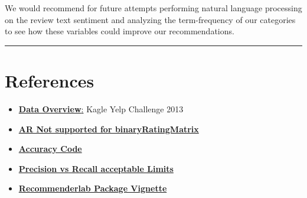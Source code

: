 \documentclass[]{article}
\providecommand{\tightlist}{%
  \setlength{\itemsep}{0pt}\setlength{\parskip}{0pt}}
\begin{document}
We would recommend for future attempts performing natural language
processing on the review text sentiment and analyzing the term-frequency
of our categories to see how these variables could improve our
recommendations.

\begin{center}\rule{0.5\linewidth}{\linethickness}\end{center}

\hypertarget{references}{%
\section{References}\label{references}}

\begin{itemize}
\tightlist
\item
  \href{https://www.kaggle.com/c/yelp-recsys-2013/overview}{\textbf{Data
  Overview}:} Kagle Yelp Challenge 2013
\item
  \href{https://github.com/mhahsler/recommenderlab/issues/29}{\textbf{AR
  Not supported for binaryRatingMatrix}}
\item
  \href{https://github.com/mhahsler/recommenderlab/blob/master/R/calcPredictionAccuracy.R}{\textbf{Accuracy
  Code}}
\item
  \href{https://stats.stackexchange.com/questions/323154/precision-vs-recall-acceptable-limits}{\textbf{Precision
  vs Recall acceptable Limits}}
\item
  \href{https://cran.r-project.org/web/packages/recommenderlab/vignettes/recommenderlab.pdf}{\textbf{Recommenderlab
  Package Vignette}}
\end{itemize}
\end{document}
